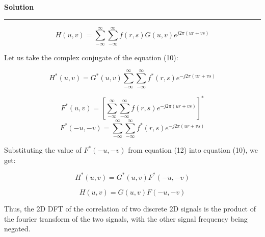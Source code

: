 \documentclass[a4paper]{article}
\newenvironment{solution}[2][]{%
    \begin{mdframed}[linecolor=green!60!black, linewidth=2pt, roundcorner=10pt, backgroundcolor=green!5!white, skipabove=12pt, skipbelow=12pt]%
        \textbf{\large #2} %
        \par\noindent\rule{\textwidth}{0.4pt} %
        \vspace{0.5em} %
}{%
    \end{mdframed}%
}
\begin{document}
\begin{solution}{Solution}
\begin{equation}
    H(u, v) = \sum_{-\infty}^{\infty} \sum_{-\infty}^{\infty} f(r, s) G(u,v) e^{j2\pi(ur+vs)}
\end{equation}


Let us take the complex conjugate of the equation (10):

\begin{equation}
    H^*(u, v) = G^*(u,v) \sum_{-\infty}^{\infty} \sum_{-\infty}^{\infty} f^*(r, s)  e^{-j2\pi(ur+vs)}
\end{equation}

\begin{equation}
    F^*(u, v) = [\sum_{-\infty}^{\infty} \sum_{-\infty}^{\infty} f(r, s)  e^{-j2\pi(ur+vs)}]^*
\end{equation}
\begin{equation}
    F^*(-u, -v) = \sum_{-\infty}^{\infty} \sum_{-\infty}^{\infty} f^*(r, s)  e^{-j2\pi(ur+vs)}
\end{equation}

Substituting the value of $F^*(-u, -v)$ from equation (12) into equation (10), we get:

\begin{equation}
    H^*(u, v) = G^*(u,v) F^*(-u, -v)
\end{equation}

\begin{equation}
    H(u, v) = G(u,v) F(-u, -v)
\end{equation}

Thus, the 2D DFT of the correlation of two discrete 2D signals is the product of the fourier transform of the two signals, with the other signal frequency being negated.

\end{solution}
\end{document}
